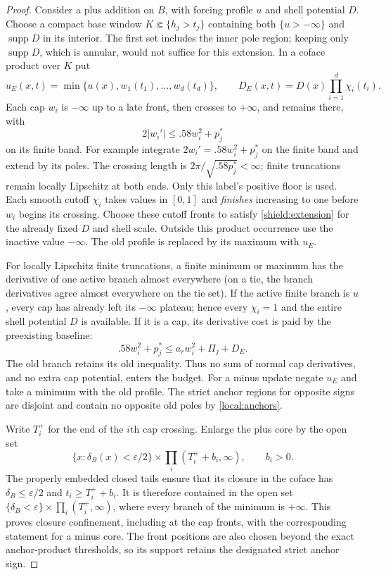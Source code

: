 \documentclass[11pt]{article}
\numberwithin{equation}{section}
\theoremstyle{definition}
\theoremstyle{remark}
\begin{document}
\begin{proof}
Consider a plus addition on $B$, with forcing profile $u$ and shell
potential $D$.  Choose a compact base window $K\Subset\{h_j>t_j\}$
containing both $\overline{\{u> -\infty\}}$ and $\operatorname{supp} D$ in its
interior.  The first set includes the inner pole region; keeping only
$\operatorname{supp} D$, which is annular, would not suffice for this extension.
In a coface product over $K$ put
\begin{equation}\label{shield:cap-formula}
 u_E(x,t)=\min\{u(x),w_1(t_1),\ldots,w_d(t_d)\},\qquad
 D_E(x,t)=D(x)\prod_{i=1}^d\chi_i(t_i).
\end{equation}
Each cap $w_i$ is $-\infty$ up to a late front, then crosses to
$+\infty$, and remains there, with
\[
 2\left\lvert{w_i'}\right\rvert\le .58w_i^2+p_j^*
\]
on its finite band.  For example integrate $2w_i'=.58w_i^2+p_j^*$ on the finite
band and extend by its poles.  The crossing length is
$2\pi/\sqrt{.58p_j^*}<\infty$; finite truncations remain locally
Lipschitz at both ends.  Only this label's positive floor is used.
Each smooth cutoff $\chi_i$ takes values in
$[0,1]$ and \emph{finishes} increasing to one before $w_i$ begins its
crossing.  Choose these cutoff fronts to satisfy
\cref{shield:extension} for the already fixed $D$ and shell scale.
Outside this product occurrence use the inactive value $-\infty$.
The old profile is replaced by its maximum with $u_E$.

For locally Lipschitz finite truncations, a finite minimum or maximum
has the derivative of one active branch almost everywhere (on a tie,
the branch derivatives agree almost everywhere on the tie set).
If the active finite branch is $u$, every cap has already left its
$-\infty$ plateau; hence every $\chi_i=1$ and the entire shell
potential $D$ is available.  If it is a cap, its derivative cost is
paid by the preexisting baseline:
\[
 .58w_i^2+p_j^*\le a_rw_i^2+\Pi_j+D_E.
\]
The old branch retains its old inequality.  Thus no sum of normal
cap derivatives, and no extra cap potential, enters the budget.
For a minus update negate $u_E$ and take a minimum with the old profile.
The strict anchor regions for opposite signs are disjoint and contain
no opposite old poles by \cref{local:anchors}.

Write $T_i^+$ for the end of the $i$th cap crossing.  Enlarge the
plus core by the open set
\[
 \{x:\delta_B(x)<\varepsilon/2\}\times
       \prod_i(T_i^++b_i,\infty),\qquad b_i>0.
\]
The properly embedded closed tails ensure that its closure in the
coface has $\delta_B\le\varepsilon/2$ and $t_i\ge T_i^++b_i$.
It is therefore contained in the open set
$\{\delta_B<\varepsilon\}\times\prod_i(T_i^+,\infty)$, where every
branch of the minimum is $+\infty$.  This proves closure confinement,
including at the cap fronts, with the corresponding statement for a
minus core.  The front positions are also chosen beyond the exact anchor-product
thresholds, so its support retains the designated strict anchor sign.


\end{proof}
\end{document}
